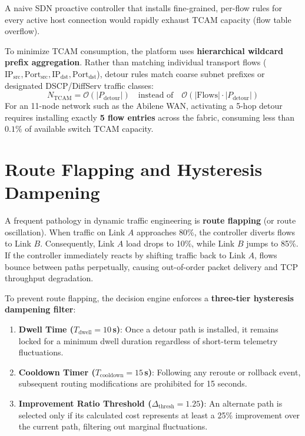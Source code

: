 A naive SDN proactive controller that installs fine-grained, per-flow rules for every active host connection would rapidly exhaust TCAM capacity (flow table overflow). 

\begin{formulabox}
To minimize TCAM consumption, the platform uses \textbf{hierarchical wildcard prefix aggregation}. Rather than matching individual transport flows ($\text{IP}_{\text{src}}, \text{Port}_{\text{src}}, \text{IP}_{\text{dst}}, \text{Port}_{\text{dst}}$), detour rules match coarse subnet prefixes or designated DSCP/DiffServ traffic classes:
\begin{equation}
  N_{\text{TCAM}} = \mathcal{O}(|P_{\text{detour}}|) \quad \text{instead of} \quad \mathcal{O}(|\text{Flows}| \cdot |P_{\text{detour}}|)
\end{equation}
For an 11-node network such as the Abilene WAN, activating a 5-hop detour requires installing exactly \textbf{5 flow entries} across the fabric, consuming less than $0.1\%$ of available switch TCAM capacity.
\end{formulabox}

\section{Route Flapping and Hysteresis Dampening}
A frequent pathology in dynamic traffic engineering is \textbf{route flapping} (or route oscillation). When traffic on Link $A$ approaches 80\%, the controller diverts flows to Link $B$. Consequently, Link $A$ load drops to 10\%, while Link $B$ jumps to 85\%. If the controller immediately reacts by shifting traffic back to Link $A$, flows bounce between paths perpetually, causing out-of-order packet delivery and TCP throughput degradation.

To prevent route flapping, the decision engine enforces a \textbf{three-tier hysteresis dampening filter}:
\begin{enumerate}
  \item \textbf{Dwell Time ($T_{\text{dwell}} = 10$\,s)}: Once a detour path is installed, it remains locked for a minimum dwell duration regardless of short-term telemetry fluctuations.
  \item \textbf{Cooldown Timer ($T_{\text{cooldown}} = 15$\,s)}: Following any reroute or rollback event, subsequent routing modifications are prohibited for 15 seconds.
  \item \textbf{Improvement Ratio Threshold ($\Delta_{\text{thresh}} = 1.25$)}: An alternate path is selected only if its calculated cost represents at least a 25\% improvement over the current path, filtering out marginal fluctuations.
\end{enumerate}

